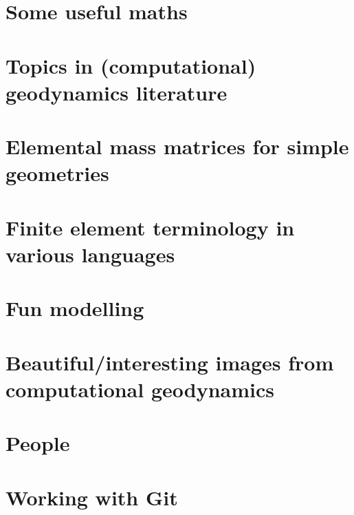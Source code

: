 \documentclass[a4paper]{article}
\begin{document}
\section{Some useful maths}  \label{app_maths} %
\newpage %
\section{Topics in (computational) geodynamics literature}\label{app:topics}
\newpage %
\section{Elemental mass matrices for simple geometries}\label{app:mm} 
\newpage %
\section{Finite element terminology in various languages}  %
\newpage %
\section{Fun modelling}  %
\newpage %
\section{Beautiful/interesting images from computational geodynamics}%
\newpage %
\section{People}%
\newpage %
\section{Working with Git} %
\end{document}
